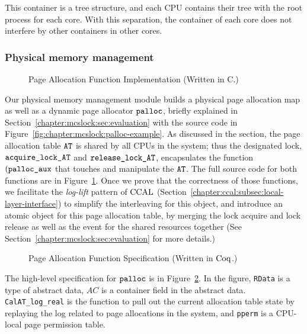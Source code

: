This container is a tree structure, and each CPU contains their tree with the root process for each core. 
With this separation, the container of each core does not interfere by other containers in other cores. 

\subsubsection{Physical memory management} 
\begin{figure}
 
\caption{Page Allocation Function Implementation (Written in C.)}
\label{fig:chapter:certikos:palloc-in-c}
\end{figure}
Our physical memory management module builds a physical page allocation map as well as a dynamic page allocator ${\mathrm{\texttt{palloc}}}$, briefly explained 
in Section~\ref{chapter:mcslock:sec:evaluation} with the source code in Figure~\ref{fig:chapter:mcslock:palloc-example}.
As discussed in the section, the page allocation table ${\mathrm{\texttt{AT}}}$ is shared by 
all CPUs in the system; thus
the designated lock, ${\mathrm{\texttt{acquire\_lock\_AT}}}$ and  ${\mathrm{\texttt{release\_lock\_AT}}}$,
encapsulates the function $({\mathrm{\texttt{palloc\_aux}}}$ that touches and manipulate the ${\mathrm{\texttt{AT}}}$.
The full source code for both functions are in Figure~\ref{fig:chapter:certikos:palloc-in-c}.
Once we prove that the correctness of those functions, we facilitate 
the \textit{log-lift} pattern of $\mathrm{CCAL}$ (Section~\ref{chapter:ccal:subsec:local-layer-interface}) to simplify the interleaving for this object,
and introduce 
an atomic object for this page allocation table, by merging the lock acquire and lock release as well as 
the event for the shared resources together (See Section~\ref{chapter:mcslock:sec:evaluation} for more details.)
\begin{figure}
 
\caption{Page Allocation Function Specification (Written in $\mathrm{Coq}$.)}
\label{fig:chapter:certikos:palloc-in-coq}
\end{figure}
The high-level specification for ${\mathrm{\texttt{palloc}}}$ is in Figure~\ref{fig:chapter:certikos:palloc-in-coq}.
In the figure, \lstinline$RData$ is a type of abstract data, $AC$ is a container field in the abstract data. 
\lstinline$CalAT_log_real$ is the function to pull out the current allocation table state by replaying  the log
related to page allocations in the system, and \lstinline$pperm$ is a CPU-local page permission table. 
